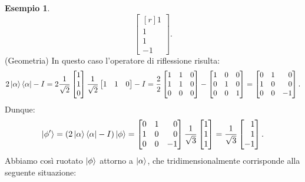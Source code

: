 \documentclass{book}
\theoremstyle{definition}
\theoremstyle{definition}
\theoremstyle{definition}
\newtheorem*{ex}{Esempio}
\theoremstyle{plain}
\theoremstyle{plain}
\theoremstyle{plain}
\theoremstyle{plain}
\begin{document}
\begin{ex}
\begin{displaymath}
\begin{bmatrix*}[r]
1 \\
1 \\
1 \\
-1
\end{bmatrix*}.
\end{displaymath}
(Geometria) In questo caso l'operatore di riflessione risulta:
\begin{displaymath}
2\ket{\alpha}\bra{\alpha} - I = 2 \frac{1}{\sqrt{2}}\begin{bmatrix}
1 \\
1 \\
0
\end{bmatrix}
\frac{1}{\sqrt{2}} \begin{bmatrix}
1 & 1 & 0 \\
\end{bmatrix}
- I = \frac{2}{2} \begin{bmatrix}
1 & 1 & 0 \\
1 & 1 & 0 \\
0 & 0 & 0 \\
\end{bmatrix}
- \begin{bmatrix}
1 & 0 & 0 \\
0 & 1 & 0 \\
0 & 0 & 1 
\end{bmatrix} = \begin{bmatrix*}[r]
0 & 1 & 0 \\
1 & 0 & 0 \\
0 & 0 & -1
\end{bmatrix*}.
\end{displaymath}
Dunque:
\begin{displaymath}
\ket{\phi'} = (2\ket{\alpha}\bra{\alpha}-I) \ket{\phi} = \begin{bmatrix*}[r]
0 & 1 & 0 \\
1 & 0 & 0 \\
0 & 0 & -1
\end{bmatrix*}
\frac{1}{\sqrt{3}}
\begin{bmatrix}
1 \\
1 \\
1 
\end{bmatrix}
= 
\frac{1}{\sqrt{3}} \begin{bmatrix*}[r]
1 \\
1 \\
-1
\end{bmatrix*}.
\end{displaymath}
Abbiamo così ruotato $\ket{\phi}$ attorno a $\ket{\alpha}$, che tridimensionalmente corrisponde alla seguente situazione:
\begin{figure}[H]
\captionsetup{font=scriptsize}


\end{figure}
\end{ex}
\end{document}
